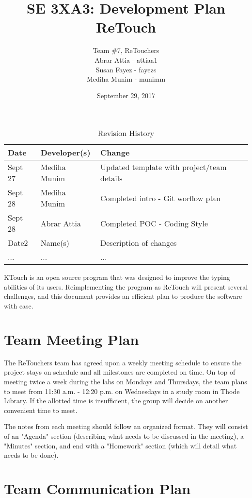 \documentclass{article}
\title{SE 3XA3: Development Plan\\ReTouch}
\author{Team \#7, ReTouchers
		\\ Abrar Attia - attiaa1
		\\ Susan Fayez - fayezs
		\\ Mediha Munim - munimm
}
\date{September 29, 2017}
\begin{document}
\begin{table}[hp]
\caption{Revision History} \label{TblRevisionHistory}
\begin{tabularx}{\textwidth}{llX}
\toprule
\textbf{Date} & \textbf{Developer(s)} & \textbf{Change}\\
\midrule
Sept 27 & Mediha Munim & Updated template with project/team details\\
Sept 28 & Mediha Munim & Completed intro - Git worflow plan\\
Sept 28 & Abrar Attia & Completed POC - Coding Style\\
Date2 & Name(s) & Description of changes\\
... & ... & ...\\
\bottomrule
\end{tabularx}
\end{table}

\newpage

\maketitle

KTouch is an open source program that was designed to improve the typing abilities of its users. Reimplementing the program as ReTouch will present several challenges, and this document provides an efficient plan to produce the software with ease.

\section{Team Meeting Plan}

	The ReTouchers team has agreed upon a weekly meeting schedule to ensure the project stays on schedule and all milestones are completed on time. On top of meeting twice a week during the labs on Mondays and Thursdays, the team plans to meet from 11:30 a.m. - 12:20 p.m. on Wednesdays in a study room in Thode Library. If the allotted time is insufficient, the group will decide on another convenient time to meet. 

The notes from each meeting should follow an organized format. They will consist of an "Agenda" section (describing what needs to be discussed in the meeting), a "Minutes" section, and end with a "Homework" section (which will detail what needs to be done).

\section{Team Communication Plan}
\end{document}
